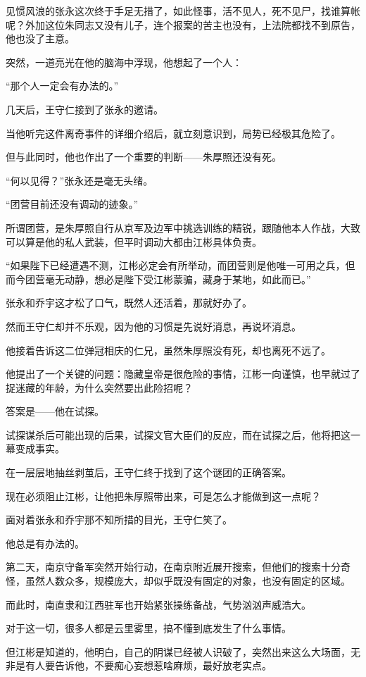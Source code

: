 \begin{multicols}{\theparacolNo}
见惯风浪的张永这次终于手足无措了，如此怪事，活不见人，死不见尸，找谁算帐呢？外加这位朱同志又没有儿子，连个报案的苦主也没有，上法院都找不到原告，他也没了主意。

突然，一道亮光在他的脑海中浮现，他想起了一个人：

“那个人一定会有办法的。”

几天后，王守仁接到了张永的邀请。

当他听完这件离奇事件的详细介绍后，就立刻意识到，局势已经极其危险了。

但与此同时，他也作出了一个重要的判断——朱厚照还没有死。

“何以见得？”张永还是毫无头绪。

“团营目前还没有调动的迹象。”

所谓团营，是朱厚照自行从京军及边军中挑选训练的精锐，跟随他本人作战，大致可以算是他的私人武装，但平时调动大都由江彬具体负责。

“如果陛下已经遭遇不测，江彬必定会有所举动，而团营则是他唯一可用之兵，但而今团营毫无动静，想必是陛下受江彬蒙骗，藏身于某地，如此而已。”

张永和乔宇这才松了口气，既然人还活着，那就好办了。

然而王守仁却并不乐观，因为他的习惯是先说好消息，再说坏消息。

他接着告诉这二位弹冠相庆的仁兄，虽然朱厚照没有死，却也离死不远了。

他提出了一个关键的问题：隐藏皇帝是很危险的事情，江彬一向谨慎，也早就过了捉迷藏的年龄，为什么突然要出此险招呢？

答案是——他在试探。

试探谋杀后可能出现的后果，试探文官大臣们的反应，而在试探之后，他将把这一幕变成事实。

在一层层地抽丝剥茧后，王守仁终于找到了这个谜团的正确答案。

现在必须阻止江彬，让他把朱厚照带出来，可是怎么才能做到这一点呢？

面对着张永和乔宇那不知所措的目光，王守仁笑了。

他总是有办法的。

第二天，南京守备军突然开始行动，在南京附近展开搜索，但他们的搜索十分奇怪，虽然人数众多，规模庞大，却似乎既没有固定的对象，也没有固定的区域。

而此时，南直隶和江西驻军也开始紧张操练备战，气势汹汹声威浩大。

对于这一切，很多人都是云里雾里，搞不懂到底发生了什么事情。

但江彬是知道的，他明白，自己的阴谋已经被人识破了，突然出来这么大场面，无非是有人要告诉他，不要痴心妄想惹啥麻烦，最好放老实点。


\end{multicols}
